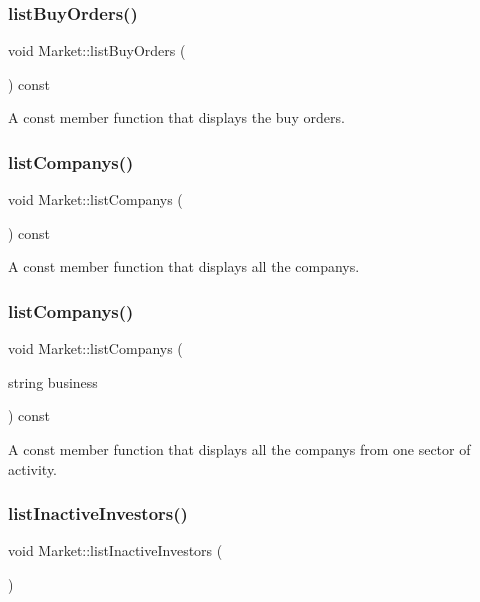 \subsubsection{\texorpdfstring{list\+Buy\+Orders()}{listBuyOrders()}}
{\footnotesize\ttfamily void Market\+::list\+Buy\+Orders (\begin{DoxyParamCaption}{ }\end{DoxyParamCaption}) const}

A const member function that displays the buy orders. \mbox{\label{class_market_a022de14760d31b423fab3a2711353951}} 
\subsubsection{\texorpdfstring{list\+Companys()}{listCompanys()}\hspace{0.1cm}{\footnotesize\ttfamily [1/2]}}
{\footnotesize\ttfamily void Market\+::list\+Companys (\begin{DoxyParamCaption}{ }\end{DoxyParamCaption}) const}

A const member function that displays all the companys. \mbox{\label{class_market_a450ea78ba7ac01e14e5d6266f220be35}} 
\subsubsection{\texorpdfstring{list\+Companys()}{listCompanys()}\hspace{0.1cm}{\footnotesize\ttfamily [2/2]}}
{\footnotesize\ttfamily void Market\+::list\+Companys (\begin{DoxyParamCaption}\item[{string}]{business }\end{DoxyParamCaption}) const}

A const member function that displays all the companys from one sector of activity. \mbox{\label{class_market_a554a30471603fa70ec376b07f60a5f9d}} 
\subsubsection{\texorpdfstring{list\+Inactive\+Investors()}{listInactiveInvestors()}}
{\footnotesize\ttfamily void Market\+::list\+Inactive\+Investors (\begin{DoxyParamCaption}{ }\end{DoxyParamCaption})}

